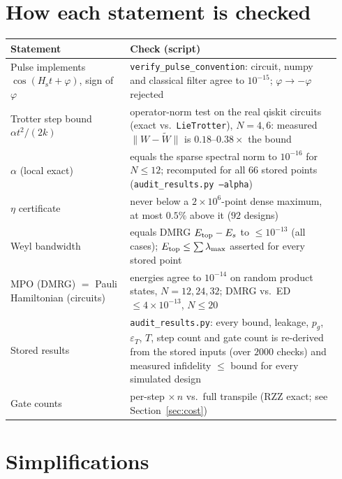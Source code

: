 \documentclass[11pt]{article}
\theoremstyle{definition}
\newcommand{\Hs}{H_{\mathrm s}}
\newcommand{\eps}{\varepsilon}
\newcommand{\code}[1]{\texttt{#1}}
\begin{document}
\section{How each statement is checked}\label{sec:verify}
\begin{center}
\small
\begin{tabular}{@{}p{0.34\linewidth}p{0.6\linewidth}@{}}
\toprule
Statement & Check (script) \\
\midrule
Pulse implements $\cos(\Hs t+\varphi)$, sign of $\varphi$ & \code{verify\_pulse\_convention}: circuit, numpy and classical filter agree to $10^{-15}$; $\varphi\to-\varphi$ rejected \\
Trotter step bound $\alpha t^2/(2k)$ & operator-norm test on the real qiskit circuits (exact vs.\ \code{LieTrotter}), $N=4,6$: measured $\|W-\tilde W\|$ is $0.18$--$0.38\times$ the bound \\
$\alpha$ (local exact) & equals the sparse spectral norm to $10^{-16}$ for $N\le12$; recomputed for all $66$ stored points (\code{audit\_results.py --alpha}) \\
$\eta$ certificate & never below a $2\times10^{6}$-point dense maximum, at most $0.5\%$ above it ($92$ designs) \\
Weyl bandwidth & equals DMRG $E_{\rm top}-E_s$ to $\le10^{-13}$ (all cases); $E_{\rm top}\le\sum\lambda_{\max}$ asserted for every stored point \\
MPO (DMRG) $=$ Pauli Hamiltonian (circuits) & energies agree to $10^{-14}$ on random product states, $N=12,24,32$; DMRG vs.\ ED $\le4\times10^{-13}$, $N\le20$ \\
Stored results & \code{audit\_results.py}: every bound, leakage, $p_g$, $\eps_T$, $T$, step count and gate count is re-derived from the stored inputs (over $2000$ checks) and measured infidelity $\le$ bound for every simulated design \\
Gate counts & per-step $\times\,n$ vs.\ full transpile (RZZ exact; see Section~\ref{sec:cost}) \\
\bottomrule
\end{tabular}
\end{center}

\section{Simplifications}\label{sec:simp}
\end{document}
